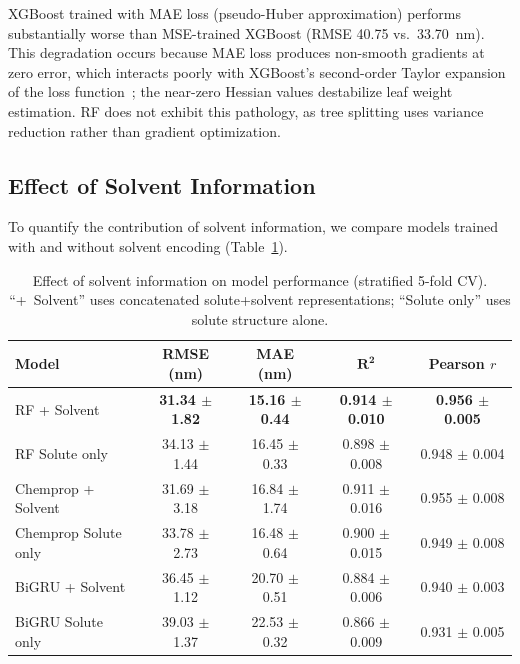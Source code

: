 \documentclass[11pt,a4paper]{article}
\begin{document}
XGBoost trained with MAE loss (pseudo-Huber approximation) performs substantially worse than MSE-trained XGBoost (RMSE 40.75 vs.\ 33.70~nm).
This degradation occurs because MAE loss produces non-smooth gradients at zero error, which interacts poorly with XGBoost's second-order Taylor expansion of the loss function~\cite{chen2016xgboost}; the near-zero Hessian values destabilize leaf weight estimation.
RF does not exhibit this pathology, as tree splitting uses variance reduction rather than gradient optimization.


\subsection{Effect of Solvent Information}
\label{sec:solvent_ablation}

To quantify the contribution of solvent information, we compare models trained with and without solvent encoding (Table~\ref{tab:solvent_ablation}).

\begin{table}[t]
\centering
\caption{Effect of solvent information on model performance (stratified 5-fold CV). ``+~Solvent'' uses concatenated solute+solvent representations; ``Solute only'' uses solute structure alone.}
\label{tab:solvent_ablation}
\begin{tabular}{lcccc}
\toprule
\textbf{Model} & \textbf{RMSE (nm)} & \textbf{MAE (nm)} & $\boldsymbol{R^2}$ & \textbf{Pearson $r$} \\
\midrule
RF + Solvent          & \textbf{31.34 $\pm$ 1.82} & \textbf{15.16 $\pm$ 0.44} & \textbf{0.914 $\pm$ 0.010} & \textbf{0.956 $\pm$ 0.005} \\
RF Solute only        & 34.13 $\pm$ 1.44          & 16.45 $\pm$ 0.33          & 0.898 $\pm$ 0.008          & 0.948 $\pm$ 0.004 \\
\midrule
Chemprop + Solvent    & 31.69 $\pm$ 3.18          & 16.84 $\pm$ 1.74          & 0.911 $\pm$ 0.016          & 0.955 $\pm$ 0.008 \\
Chemprop Solute only  & 33.78 $\pm$ 2.73          & 16.48 $\pm$ 0.64          & 0.900 $\pm$ 0.015          & 0.949 $\pm$ 0.008 \\
\midrule
BiGRU + Solvent       & 36.45 $\pm$ 1.12          & 20.70 $\pm$ 0.51          & 0.884 $\pm$ 0.006          & 0.940 $\pm$ 0.003 \\
BiGRU Solute only     & 39.03 $\pm$ 1.37          & 22.53 $\pm$ 0.32          & 0.866 $\pm$ 0.009          & 0.931 $\pm$ 0.005 \\
\bottomrule
\end{tabular}
\end{table}
\end{document}
